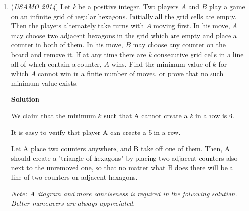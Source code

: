 \begin{enumerate}
 Therefore,

 
 \[(b-c)Q(a) + (c-a)Q(b) + (a-b)Q(c)=(1-a-b-c)(a-b)(b-c)(c-a)\]. 

 \textbf{2014 USAMO P3:}

 Here, $a^3$ occurs on the RHS and $(b-c)a^3$ is the term. These are equivalent, hence solutions exist only if $Q(x)$ is monic. Then, let $Q(x) = x^3 + R(x)$ where $R(x)$ is a polynomial of degree at most 2. Hence we have that, after reduction,

 
 \[(b-c)R(a) + (c-a)R(b) + (a-b)R(c) = (a-b)(b-c)(c-a)\].

 Comparing leading coefficients we see that $R(x)$ has leading coefficient -1 and is quadratic. It is easy to see $R(x) = -x^2$ works, hence $Q(x) = x^3-x^2$, and there exist infinitely many $P(x)$ that satisfy the coordinates:
 \[P(n) = (n+671, n^3-n^2) \qquad \square\]



	\item (\textit{USAMO 2014}) Let $k$ be a positive integer. Two players $A$ and $B$ play a game on an infinite grid of regular hexagons. Initially all the grid cells are empty. Then the players alternately take turns with $A$ moving first. In his move, $A$ may choose two adjacent hexagons in the grid which are empty and place a counter in both of them. In his move, $B$ may choose any counter on the board and remove it. If at any time there are $k$ consecutive grid cells in a line all of which contain a counter, $A$ wins. Find the minimum value of $k$ for which $A$ cannot win in a finite number of moves, or prove that no such minimum value exists.


 



\textbf{Solution}

We claim that the minimum $k$ such that A cannot create a $k$ in a row is $\boxed{6}$.

 It is easy to verify that player A can create a 5 in a row.

 Let A place two counters anywhere, and B take off one of them. Then, A should create a "triangle of hexagons" by placing two adjacent counters also next to the unremoved one, so that no matter what B does there will be a line of two counters on adjacent hexagons.

 \textit{Note: A diagram and more conciseness is required in the following solution. Better maneuvers are always appreciated.}


\end{enumerate}
